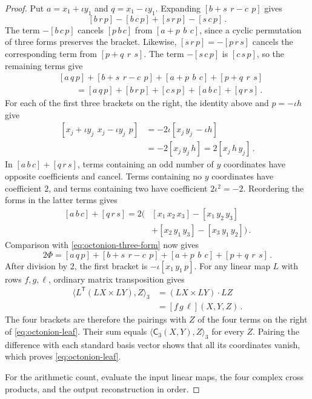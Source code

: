 \documentclass[11pt,reqno]{amsart}
\numberwithin{equation}{section}
\newcommand{\AltC}{\mathsf C}
\begin{document}
\begin{proof}
Put $a=x_1+\iota y_1$ and $q=x_1-\iota y_1$. Expanding
$[b+s\,\ r-c\,\ p]$ gives
\[
[b\,r\,p]-[b\,c\,p]+[s\,r\,p]-[s\,c\,p]\,.
\]
The term $-[b\,c\,p]$ cancels $[p\,b\,c]$ from
$[a+p\,\ b\,\ c]$, since a cyclic permutation of three forms preserves
the bracket. Likewise, $[s\,r\,p]=-[p\,r\,s]$ cancels the corresponding
term from $[p+q\,\ r\,\ s]$. The term $-[s\,c\,p]$ is
$[c\,s\,p]$, so the remaining terms give
\[
\begin{aligned}
&[a\,q\,p]+[b+s\,\ r-c\,\ p]
 +[a+p\,\ b\,\ c]+[p+q\,\ r\,\ s]\\
&\qquad=[a\,q\,p]+[b\,r\,p]+[c\,s\,p]
       +[a\,b\,c]+[q\,r\,s]\,.
\end{aligned}
\]
For each of the first three brackets on the right, the identity above
and $p=-\iota h$ give
\[
\begin{aligned}
[x_j+\iota y_j\,\ x_j-\iota y_j\,\ p]
&=-2\iota[x_j\,y_j\,-\iota h]\\
&=-2[x_j\,y_j\,h]
 =2[x_j\,h\,y_j]\,.
\end{aligned}
\]
In $[a\,b\,c]+[q\,r\,s]$, terms containing an odd number of $y$
coordinates have opposite coefficients and cancel. Terms containing no
$y$ coordinates have coefficient $2$, and terms containing two have
coefficient $2\iota^2=-2$. Reordering the forms in the latter terms gives
\[
\begin{aligned}
[a\,b\,c]+[q\,r\,s]
=2\bigl(&[x_1\,x_2\,x_3]-[x_1\,y_2\,y_3]\\
       &+[x_2\,y_1\,y_3]-[x_3\,y_1\,y_2]\bigr)\,.
\end{aligned}
\]
Comparison with \eqref{eq:octonion-three-form} now gives
\[
2\Phi=[a\,q\,p]+[b+s\,\ r-c\,\ p]
       +[a+p\,\ b\,\ c]+[p+q\,\ r\,\ s]\,.
\]
After division by $2$, the first bracket is
$-\iota[x_1\,y_1\,p]$. For any linear map $L$ with rows $f,g,\ell$,
ordinary matrix transposition gives
\[
\begin{aligned}
\langle L^{\mathsf T}(LX\times LY),Z\rangle_3
&=(LX\times LY)\cdot LZ\\
&=[f\,g\,\ell](X,Y,Z)\,.
\end{aligned}
\]
The four brackets are therefore the pairings with $Z$ of the four terms
on the right of \eqref{eq:octonion-leaf}. Their sum equals
$\langle\AltC_3(X,Y),Z\rangle_3$ for every $Z$. Pairing the difference
with each standard basis vector shows that all its coordinates vanish,
which proves \eqref{eq:octonion-leaf}.

For the arithmetic count, evaluate the input linear maps, the four
complex cross products, and the output reconstruction in order.


\end{proof}
\end{document}
